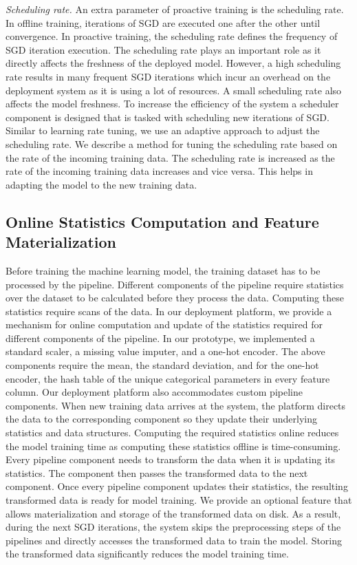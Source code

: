 \textit{Scheduling rate.}
An extra parameter of proactive training is the scheduling rate.
In offline training, iterations of SGD are executed one after the other until convergence.
In proactive training, the scheduling rate defines the frequency of SGD iteration execution.
The scheduling rate plays an important role as it directly affects the freshness of the deployed model.
However, a high scheduling rate results in many frequent SGD iterations which incur an overhead on the deployment system as it is using a lot of resources.
A small scheduling rate also affects the model freshness.
To increase the efficiency of the system a scheduler component is designed that is tasked with scheduling new iterations of SGD.
Similar to learning rate tuning, we use an adaptive approach to adjust the scheduling rate.
We describe a method for tuning the scheduling rate based on the rate of the incoming training data.
The scheduling rate is increased as the rate of the incoming training data increases and vice versa.
This helps in adapting the model to the new training data.

\subsection{Online Statistics Computation and Feature Materialization}
Before training the machine learning model, the training dataset has to be processed by the pipeline.
Different components of the pipeline require statistics over the dataset to be calculated before they process the data.
Computing these statistics require scans of the data.
In our deployment platform, we provide a mechanism for online computation and update of the statistics required for different components of the pipeline.
In our prototype, we implemented a standard scaler, a missing value imputer, and a one-hot encoder.
The above components require the mean, the standard deviation, and for the one-hot encoder, the hash table of the unique categorical parameters in every feature column.
Our deployment platform also accommodates custom pipeline components.
When new training data arrives at the system, the platform directs the data to the corresponding component so they update their underlying statistics and data structures.
Computing the required statistics online reduces the model training time as computing these statistics offline is time-consuming.
Every pipeline component needs to transform the data when it is updating its statistics.
The component then passes the transformed data to the next component.
Once every pipeline component updates their statistics, the resulting transformed data is ready for model training.
We provide an optional feature that allows materialization and storage of the transformed data on disk.
As a result, during the next SGD iterations, the system skips the preprocessing steps of the pipelines and directly accesses the transformed data to train the model.
Storing the transformed data significantly reduces the model training time.

